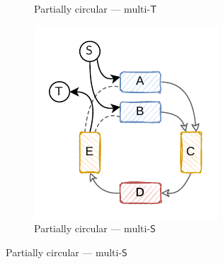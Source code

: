 \begin{figure}
\begin{subfigure}{0.3\linewidth}
    \caption{Partially circular --- multi-\(\mathsf{T}\)}%
    \label{subfig:plasmid_structure:pc_multi_t}
  \end{subfigure}
  \hfill
  \begin{subfigure}{0.3\linewidth}
    \centering
    \includegraphics[width=\linewidth]{plasmid_structures/img/plasmid_structure-pc_multi_s.pdf}
    \caption{Partially circular --- multi-\(\mathsf{S}\)}%
    \label{subfig:plasmid_structure:pc_multi_s}
  \end{subfigure}


\end{figure}
